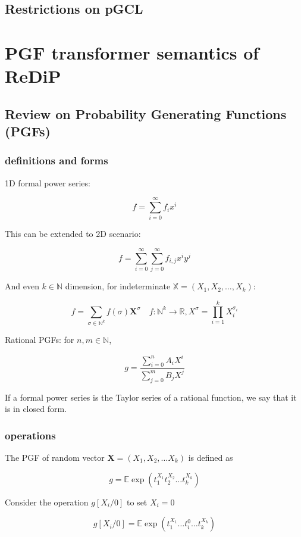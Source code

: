 \documentclass[a4paper]{article}
\begin{document}
\subsection{Restrictions on pGCL}

\section{PGF transformer semantics of ReDiP}

\subsection{Review on Probability Generating Functions (PGFs)}

\subsubsection{definitions and forms}

1D formal power series:

\[
	f = \sum_{i=0}^\infty f_i x^i
\]

This can be extended to 2D scenario:

\[
	f = \sum_{i=0}^\infty\sum_{j=0}^\infty f_{i,j} x^i y^j
\]

And even \(k\in\mathbb{N}\) dimension, for indeterminate \(\mathbb{X}=(X_1,X_2,\ldots,X_k)\):

\[
	f = \sum_{\sigma\in\mathbb{N}^k} f(\sigma) \mathbf{X}^\sigma
	\quad
	f:\mathbb{N}^k\to\mathbb{R},
	X^\sigma = \prod_{i=1}^k X_i^{\sigma_i}
\]

Rational PGFs: for \(n,m\in\mathbb{N}\),

\[
	g = \frac{\sum_{i=0}^n A_i X^i}{\sum_{j=0}^m B_j X^j}
\]

If a formal power series is the Taylor series of a rational function, we say that it is in closed form.

\subsubsection{operations}

The PGF of random vector \(\mathbf{X} = (X_1,X_2,\ldots X_k)\) is defined as

\[
	g = \mathbb{E} \exp\left( t_1^{X_1} t_2^{X_2} \ldots t_k^{X_k} \right)
\]

Consider the operation \(g[X_i/0]\) to set \(X_i=0\)

\[
	g[X_i/0] = \mathbb{E} \exp\left( t_1^{X_1} \ldots t_i^{0} \ldots t_k^{X_k} \right)
\]
\end{document}
